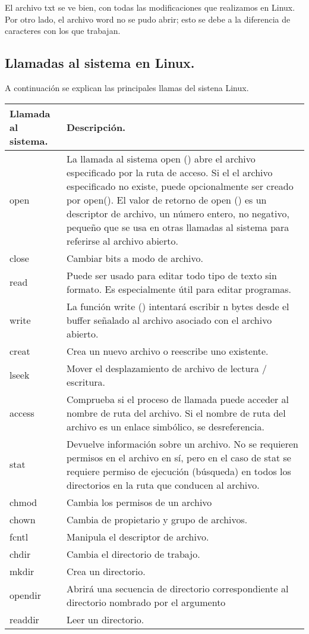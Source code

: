 \documentclass[12pt]{article}
\begin{document}
    
    El archivo txt se ve bien, con todas las modificaciones que realizamos en Linux. Por otro lado, el archivo word no se pudo abrir; esto se debe a la diferencia de caracteres con los que trabajan.
    \newpage
    
\subsection{Llamadas al sistema en Linux.}
A continuación se explican las principales llamas del sistena Linux.

    \begin{tabular}{
			|p{5cm}|p{10cm}||}
			\hline
			\textbf{ Llamada al sistema.} & \textbf{ Descripción.}\\ 
			\hline
			\hline open & La llamada al sistema open () abre el archivo especificado por la ruta de acceso. Si el el archivo especificado no existe, puede opcionalmente  ser creado por open().
			El valor de retorno de open () es un descriptor de archivo, un número entero, no negativo, pequeño  que se usa en otras llamadas al sistema para referirse al archivo abierto.
			\\
			
			\hline close& Cambiar bits a modo de archivo.\\
			\hline read & Puede ser usado para editar todo tipo de texto sin formato. Es especialmente útil para editar programas.\\
			\hline write & La función write () intentará escribir n bytes desde el buffer señalado  al archivo asociado con el archivo abierto.\\
			\hline creat & Crea un nuevo archivo o reescribe uno existente. \\
			\hline lseek & Mover el desplazamiento de archivo de lectura / escritura.\\
			\hline access & Comprueba si el proceso de llamada puede acceder al nombre de ruta del archivo. Si el nombre de ruta del archivo es un enlace simbólico, se desreferencia.\\
			\hline stat & Devuelve información sobre un archivo. No se requieren permisos en el archivo en sí, pero en el caso de stat  se requiere permiso de ejecución (búsqueda) en todos los directorios en la ruta que conducen al archivo.\\
			\hline chmod & Cambia los permisos de un archivo \\
			\hline chown & Cambia de  propietario y grupo de archivos.\\
			\hline fcntl & Manipula el descriptor de archivo.\\
			\hline chdir & Cambia el directorio de trabajo.\\
			\hline mkdir & Crea un directorio.\\
			\hline opendir & Abrirá una secuencia de directorio correspondiente al directorio nombrado por el argumento\\
			\hline readdir & Leer un directorio.\\
			\hline
			\end{tabular}\\
			\newpage
			
\end{document}
